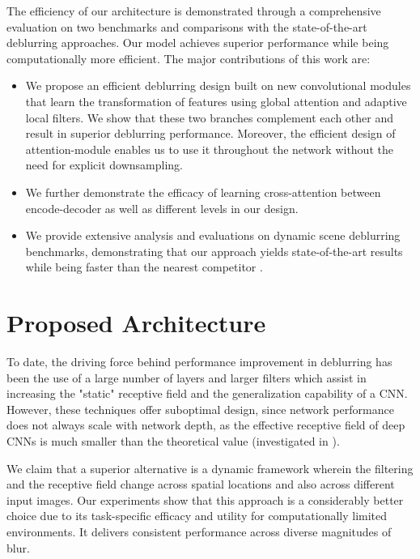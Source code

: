\documentclass[10pt,twocolumn,letterpaper]{article}
\begin{document}
The efficiency of our architecture is demonstrated through a comprehensive evaluation on two benchmarks and comparisons with the state-of-the-art deblurring approaches. Our model achieves superior performance while being computationally more efficient. The major contributions of this work are:
\renewcommand{\labelenumi}{\Roman{enumi}}
\begin{itemize}


    \item We propose an efficient deblurring design built on new convolutional modules that learn the transformation of features using global attention and adaptive local filters. We show that these two branches complement each other and result in superior deblurring performance. Moreover, the efficient design of attention-module enables us to use it throughout the network without the need for explicit downsampling.
    
    \item We further demonstrate the efficacy of learning cross-attention between encode-decoder as well as different levels in our design.
    
    \item We provide extensive analysis and evaluations on dynamic scene deblurring benchmarks, demonstrating that our approach yields state-of-the-art results while being  faster than the nearest competitor \cite{zhang2019deep}.
\end{itemize}





\section{Proposed Architecture}
To date, the driving force behind performance improvement in deblurring has been the use of a large number of layers and larger filters which assist in increasing the "static" receptive field and the generalization capability of a CNN. However, these techniques offer suboptimal design, since network performance does not always scale with network depth, as the effective receptive field of deep CNNs is much smaller than the theoretical value (investigated in \cite{luo2016understanding}).

We claim that a superior alternative is a dynamic framework wherein the filtering and the receptive field change across spatial locations and also across different input images. Our experiments show that this approach is a considerably better choice due to its task-specific efficacy and utility for computationally limited environments. It delivers consistent performance across diverse magnitudes of blur.
\end{document}
